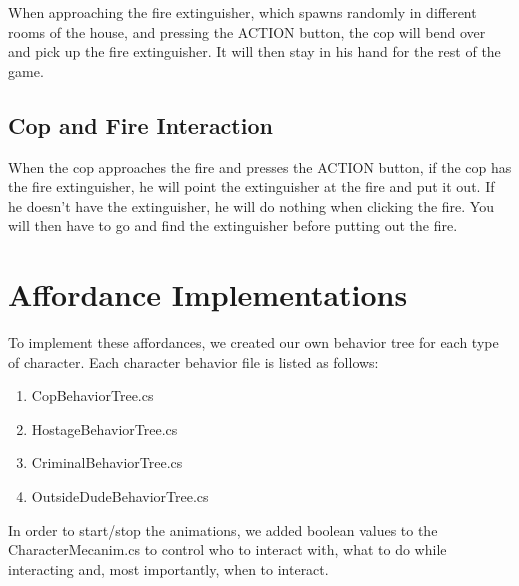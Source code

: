 \documentclass[12pt]{article}
\begin{document}
When approaching the fire extinguisher, which spawns randomly in different rooms of the house, and pressing the ACTION button, the cop will bend over and pick up the fire extinguisher. It will then stay in his hand for the rest of the game.\\

\subsection*{Cop and Fire Interaction}

When the cop approaches the fire and presses the ACTION button, if the cop has the fire extinguisher, he will point the extinguisher at the fire and put it out. If he doesn't have the extinguisher, he will do nothing when clicking the fire. You will then have to go and find the extinguisher before putting out the fire.\\
\newpage


\section*{\center Affordance Implementations}
\vspace{10pt}

To implement these affordances, we created our own behavior tree for each type of character. Each character behavior file is listed as follows:

\begin{enumerate}
	\item CopBehaviorTree.cs
	\item HostageBehaviorTree.cs
	\item CriminalBehaviorTree.cs
	\item OutsideDudeBehaviorTree.cs
\end{enumerate}

In order to start/stop the animations, we added boolean values to the CharacterMecanim.cs to control who to interact with, what to do while interacting and, most importantly, when to interact. \\

\newpage

\end{document}
